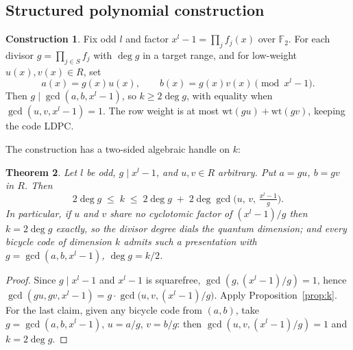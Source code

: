 \documentclass[journal,onecolumn]{IEEEtran}
\newtheorem{theorem}{Theorem}
\theoremstyle{definition}
\newtheorem{construction}[theorem]{Construction}
\theoremstyle{remark}
\newcommand{\F}{\mathbb{F}}
\newcommand{\wt}{\mathrm{wt}}
\begin{document}
\subsection{Structured polynomial construction}
\begin{construction}\label{cons:search}
Fix odd $l$ and factor $x^{l}-1=\prod_j f_j(x)$ over $\F_2$. For each divisor
$g=\prod_{j\in S}f_j$ with $\deg g$ in a target range, and for low-weight
$u(x),v(x)\in R$, set
\[
a(x)=g(x)u(x),\qquad b(x)=g(x)v(x)\pmod{x^{l}-1}.
\]
Then $g\mid\gcd(a,b,x^l-1)$, so $k\ge 2\deg g$, with equality when
$\gcd(u,v,x^{l}-1)=1$. The row weight is at most
$\wt(gu)+\wt(gv)$, keeping the code LDPC.
\end{construction}

The construction has a two-sided algebraic handle on $k$:

\begin{theorem}\label{thm:window}
Let $l$ be odd, $g\mid x^{l}-1$, and $u,v\in R$ arbitrary. Put
$a=gu$, $b=gv$ in $R$. Then
\[
2\deg g\;\le\;k\;\le\;2\deg g\;+\;2\deg\gcd\!\bigl(u,\,v,\,\tfrac{x^{l}-1}{g}\bigr).
\]
In particular, if $u$ and $v$ share no cyclotomic factor of $(x^l-1)/g$ then
$k=2\deg g$ exactly, so the divisor degree \emph{dials} the quantum
dimension; and every bicycle code of dimension $k$ admits such a presentation
with $g=\gcd(a,b,x^{l}-1)$, $\deg g=k/2$.
\end{theorem}
\begin{proof}
Since $g\mid x^{l}-1$ and $x^{l}-1$ is squarefree, $\gcd(g,(x^l-1)/g)=1$,
hence
$\gcd(gu,gv,x^{l}-1)=g\cdot\gcd\!\big(u,v,(x^{l}-1)/g\big)$. Apply
Proposition~\ref{prop:k}. For the last claim, given any bicycle code from
$(a,b)$, take $g=\gcd(a,b,x^{l}-1)$, $u=a/g$, $v=b/g$: then
$\gcd(u,v,(x^l-1)/g)=1$ and $k=2\deg g$.
\end{proof}
\end{document}
